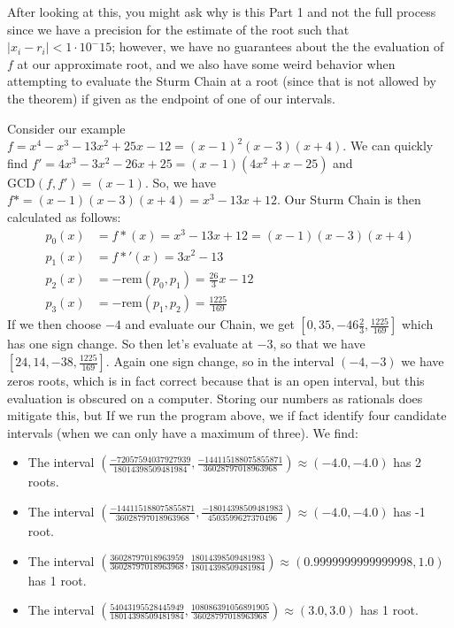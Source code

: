 \documentclass[]{article}
\theoremstyle{definition}
\begin{document}
After looking at this, you might ask why is this Part 1 and not the full process since we have a precision for the estimate of the root such that $|x_i - r_i| < 1 \cdot 10^-15$; however, we have no guarantees about the the evaluation of $f$ at our approximate root, and we also have some weird behavior when attempting to evaluate the Sturm Chain at a root (since that is not allowed by the theorem) if given as the endpoint of one of our intervals. 

Consider our example $f = x^4 - x^3 - 13x^2 + 25x - 12 = (x - 1)^2(x - 3)(x + 4)$. We can quickly find $f' = 4x^3 - 3x^2 -26x + 25 = (x-1)(4x^2 +x - 25)$ and $\textrm{GCD}(f, f') = (x - 1)$. So, we have $f* = (x - 1)(x -3)(x + 4) = x^3 - 13x + 12$. Our Sturm Chain is then calculated as follows:
\begin{align*}
p_0(x) &= f*(x) = x^3 - 13x + 12 = (x - 1)(x - 3)(x + 4) \\
p_1(x) &= f*'(x) = 3x^2 - 13 \\
p_2(x) &= -\textrm{rem}(p_0, p_1) = \frac{26}{3}x-12 \\
p_3(x) &= -\textrm{rem}(p_1, p_2) = \frac{1225}{169}
\end{align*}
If we then choose $-4$ and evaluate our Chain, we get $[0, 35, -46\frac{2}{3}, \frac{1225}{169}]$ which has one sign change. So then let's evaluate at $-3$, so that we have $[24, 14, -38, \frac{1225}{169}]$. Again one sign change, so in the interval $(-4, -3)$ we have zeros roots, which is in fact correct because that is an open interval, but this evaluation is obscured on a computer. Storing our numbers as rationals does mitigate this, but If we run the program above, we if fact identify four candidate intervals (when we can only have a maximum of three). We find:
\begin{itemize}
	\item The interval $(\frac{-72057594037927939}{18014398509481984}, \frac{-144115188075855871}{36028797018963968}) \approx (-4.0, -4.0)$ has 2 roots.
	\item The interval $(\frac{-144115188075855871}{36028797018963968}, \frac{-18014398509481983}{4503599627370496}) \approx (-4.0, -4.0)$ has -1 root.
	\item The interval $(\frac{36028797018963959}{36028797018963968}, \frac{18014398509481983}{18014398509481984}) \approx (0.9999999999999998, 1.0)$ has 1 root.
	\item The interval $(\frac{54043195528445949}{18014398509481984}, \frac{108086391056891905}{36028797018963968}) \approx (3.0, 3.0)$ has 1 root.
\end{itemize}
\end{document}

